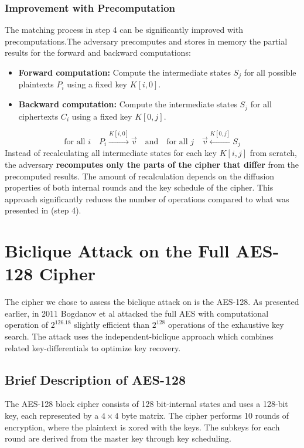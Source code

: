 \documentclass{report}
\begin{document}
 \subsubsection{Improvement with Precomputation}
 The matching process in step 4 can be significantly improved with precomputations.The adversary precomputes and stores in memory the partial results for the forward and backward computations:

 \begin{itemize}
    \item \textbf{Forward computation:} Compute the intermediate states $S_j$ for all possible plaintexts $P_i$ using a fixed key $K[i, 0]$.
    \item \textbf{Backward computation:} Compute the intermediate states $S_j$ for all ciphertexts $C_i$ using a fixed key $K[0, j]$.
 \end{itemize}

 \begin{equation}
    \text{for all } i \quad P_i \xrightarrow{K[i, 0]} \vec{v} \quad \text{and} \quad \text{for all } j \quad \vec{v} \xleftarrow{K[0, j]} S_j
 \end{equation}
 Instead of recalculating all intermediate states for each key $K[i, j]$ from scratch, the adversary \textbf{recomputes only the parts of the cipher that differ} from the precomputed results. The amount of recalculation depends on the diffusion properties of both internal rounds and the key schedule of the cipher. This approach significantly reduces the number of operations compared to what was presented in (step 4).


 \section{Biclique Attack on the Full AES-128 Cipher}
 The cipher we chose to assess the biclique attack on is the AES-128. As presented earlier, in 2011
Bogdanov et al \cite{bogdanov2011biclique} attacked the full AES with computational operation of $2^{126.18}$
slightly efficient than $2^{128}$ operations of the exhaustive key search. The attack uses the independent-biclique
approach which combines related key-differentials to optimize key recovery.


 \subsection{Brief Description of AES-128}
 The AES-128 block cipher consists of 128 bit-internal states and uses a 128-bit key, each represented by a $4 \times 4$ byte matrix. The cipher performs 10 rounds of encryption, where the plaintext is xored with the keys. The subkeys for each round are derived from the master key through key scheduling.
\end{document}
